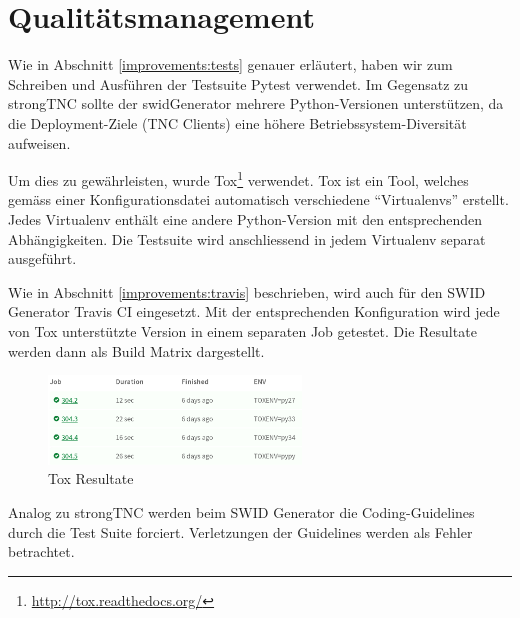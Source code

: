 

\section{Qualitätsmanagement}
\label{swidgenerator:architektur:qa}

Wie in Abschnitt \ref{improvements:tests} genauer erläutert, haben wir zum
Schreiben und Ausführen der Testsuite Pytest verwendet. Im Gegensatz zu
strongTNC sollte der swidGenerator mehrere Python-Versionen unterstützen, da die
Deployment-Ziele (TNC Clients) eine höhere Betriebssystem-Diversität aufweisen.

Um dies zu gewährleisten, wurde Tox\footnote{\url{http://tox.readthedocs.org/}}
verwendet. Tox ist ein Tool, welches gemäss einer Konfigurationsdatei
automatisch verschiedene \enquote{Virtualenvs} erstellt. Jedes Virtualenv
enthält eine andere Python-Version mit den entsprechenden Abhängigkeiten. Die
Testsuite wird anschliessend in jedem Virtualenv separat ausgeführt.


Wie in Abschnitt \ref{improvements:travis} beschrieben, wird auch für den SWID
Generator Travis CI eingesetzt. Mit der entsprechenden Konfiguration wird jede
von Tox unterstützte Version in einem separaten Job getestet. Die Resultate
werden dann als Build Matrix dargestellt.

\begin{figure}[H]
	\centering
	\includegraphics[width=0.6\textwidth]{images/travis-results}
	\caption{Tox Resultate}
	\label{swidgenerator:qa:tox}
\end{figure}

Analog zu strongTNC werden beim SWID Generator die Coding-Guidelines durch die
Test Suite forciert. Verletzungen der Guidelines werden als Fehler betrachtet.

